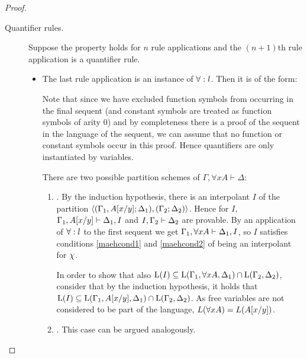 \begin{proof}
\begin{description}
		\item[\normalfont Quantifier rules.]
			Suppose the property holds for $n$ rule applications and the $(n+1)$th rule application is a quantifier rule.

			\begin{itemize}
				\item The last rule application is an instance of $\operatorname{\forall}:l$. Then it is of the form:
					\begin{prooftree}
					\end{prooftree}
					Note that since we have excluded function symbols from occurring in the final sequent (and constant symbols are treated as function symbols of arity 0) and
					by completeness there is a proof of the sequent in the language of the sequent, we can assume that no function or constant symbols occur in this proof.
					Hence quantifiers are only instantiated by variables.

					There are two possible partition schemes of $\Gamma, \forall x A \vdash \Delta$:
					\begin{enumerate}
						\item {}.
							By the induction hypothesis, there is an interpolant $I$ of the partition $ \langle (\Gamma_1, A[x/y]; \Delta_1),\allowbreak (\Gamma_2; \Delta_2)\rangle $.
							Hence for $I$, 
							$\Gamma_1, A[x/y] \vdash \Delta_1, I$ and  
							$I, \Gamma_2 \vdash \Delta_2$ are provable.
							By an application of $\operatorname{\forall}:l$ to the first sequent we get $\Gamma_1, \forall x A\vdash \Delta_1, I$, so $I$ satisfies conditions \ref{maehcond1} and \ref{maehcond2} of being an interpolant for $\chi$.

							In order to show that also $\operatorname{L}(I) \subseteq \operatorname{L}(\Gamma_1, \forall x A, \Delta_1) \cap \operatorname{L}(\Gamma_2, \Delta_2)$, consider that by the induction hypothesis, it holds that
							$\operatorname{L}(I) \subseteq \operatorname{L}(\Gamma_1, A[x/y], \Delta_1) \cap \operatorname{L}(\Gamma_2, \Delta_2)$.
							As free variables are not considered to be part of the language, $L(\forall x A) = L(A[x/y])$.


						\item {}.
							This case can be argued analogously.
					\end{enumerate}


\end{itemize}
\end{description}
\end{proof}
